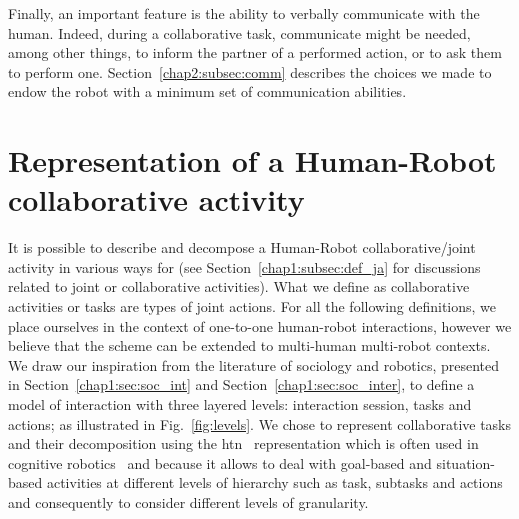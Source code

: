 \documentclass[a4paper,11pt,twoside]{StyleThese}
\begin{document}
Finally, an important feature is the ability to verbally communicate with the human. Indeed, during a collaborative task, communicate might be needed, among other things, to inform the partner of a performed action, or to ask them to perform one. Section~\ref{chap2:subsec:comm} describes the choices we made to endow the robot with a minimum set of communication abilities.



\section{Representation of a Human-Robot collaborative activity}\label{chap2:sec:levels}
It is possible to describe and decompose a Human-Robot collaborative/joint activity in various ways for (see Section~\ref{chap1:subsec:def_ja} for discussions related to joint or collaborative activities). What we define as collaborative activities or tasks are types of joint actions. For all the following definitions, we place ourselves in the context of one-to-one human-robot interactions, however we  believe that the scheme can be extended to multi-human multi-robot contexts. 
We draw our inspiration from the literature of sociology and robotics, presented in Section~\ref{chap1:sec:soc_int} and Section~\ref{chap1:sec:soc_inter}, to define a model of interaction with three layered levels: interaction session, tasks and actions; as illustrated in Fig.~\ref{fig:levels}. We chose to represent collaborative tasks and their decomposition using the \acrfull{htn}~\cite{ghallab_2016_automated} representation which is often used in cognitive robotics~\cite{ingrand-2017,lallement_2014_hatp, buisan_2021_human} and because it allows to deal with goal-based and situation-based activities at different levels of hierarchy such as task, subtasks and actions and consequently to consider different levels of granularity. 
\end{document}
